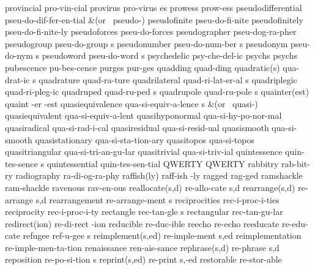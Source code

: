\1 provincial		pro-vin-cial		%
\5 provirus		pro-virus es		%
\1 prowess		prow-ess		%
\1 pseudodifferential	pseu-do-dif-fer-en-tial
\tabalign {}		&\null\quad (or \ pseudo-{}) \cr
\1 pseudofinite 	pseu-do-fi-nite
\1 pseudofinitely	pseu-do-fi-nite-ly
\1 pseudoforces 	pseu-do-forces
\1 pseudographer	pseu-dog-ra-pher	%
\5 pseudogroup		pseu-do-group s		%
\NewWordtrue
\5 pseudonumber 	pseu-do-num-ber s	%
\5 pseudonym		pseu-do-nym s
\5 pseudoword		pseu-do-word s
\1 psychedelic		psy-che-del-ic
\1 psychs		psychs
\1 pubescence		pu-bes-cence
\1 purges		pur-ges			%
\1 quadding		quad-ding
\2 quadratic(s)		qua-drat-ic s
\1 quadrature		quad-ra-ture
\5 quadrilateral	quad-ri-lat-er-al s	%
\1 quadriplegic		quad-ri-pleg-ic
\5 quadruped		quad-ru-ped s		%
\5 quadrupole		quad-ru-pole s		%
\3 quainter(est)	quaint -er -est
\5 quasiequivalence	qua-si-equiv-a-lence s
\tabalign {}		&\null\quad (or \ quasi-{}) \cr
\1 quasiequivalent	qua-si-equiv-a-lent	%
\1 quasihyponormal	qua-si-hy-po-nor-mal
\1 quasiradical 	qua-si-rad-i-cal
\1 quasiresidual	qua-si-resid-ual
\1 quasismooth		qua-si-smooth
\1 quasistationary	qua-si-sta-tion-ary
\1 quasitopos		qua-si-topos
\1 quasitriangular	qua-si-tri-an-gu-lar
\1 quasitrivial		qua-si-triv-ial		%
\5 quintessence		quin-tes-sence s
\1 quintessential	quin-tes-sen-tial
\NewWordtrue
\1 QWERTY               QWERTY                  %
\1 rabbitry		rab-bit-ry
\1 radiography		ra-di-og-ra-phy
\2 raffish(ly)		raff-ish -ly
\NewWordtrue
\1 ragged		rag-ged			%
\1 ramshackle		ram-shackle
\1 ravenous		rav-en-ous
\2 reallocate(s,d)	re-allo-cate s,d	%
\2 rearrange(s,d)	re-arrange s,d		%
\5 rearrangement	re-arrange-ment s
\1 reciprocities	rec-i-proc-i-ties
\1 reciprocity		rec-i-proc-i-ty
\5 rectangle		rec-tan-gle s
\1 rectangular		rec-tan-gu-lar
\2 redirect(ion)	re-di-rect -ion		%
\1 reducible            re-duc-ible		%
\1 reecho		re-echo
\1 reeducate		re-edu-cate		%
\5 refugee		ref-u-gee s		%
\2 reimplement(s,ed)	re-imple-ment s,ed	%
\1 reimplementation	re-imple-men-ta-tion	%
\1 renaissance		ren-ais-sance		%
\2 rephrase(s,d)	re-phrase s,d		%
\5 reposition		re-po-si-tion s		%
\2 reprint(s,ed)	re-print s,-ed
\1 restorable		re-stor-able
